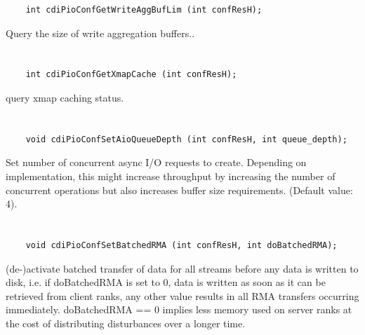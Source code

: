 \begin{verbatim}
    int cdiPioConfGetWriteAggBufLim (int confResH);
\end{verbatim}

Query the size of write
aggregation buffers..


\section*{\tt {}}

\begin{verbatim}
    int cdiPioConfGetXmapCache (int confResH);
\end{verbatim}

query xmap caching status.


\section*{\tt {}}

\begin{verbatim}
    void cdiPioConfSetAioQueueDepth (int confResH, int queue_depth);
\end{verbatim}

Set number of concurrent async I/O
requests to create. Depending on implementation, this might
increase throughput by increasing the number of concurrent
operations but also increases buffer size requirements.
(Default value: 4).


\section*{\tt {}}

\begin{verbatim}
    void cdiPioConfSetBatchedRMA (int confResH, int doBatchedRMA);
\end{verbatim}

(de-)activate batched transfer of data
for all streams before any data is written to disk, i.e. if
doBatchedRMA is set to 0, data is written as soon as it can be
retrieved from client ranks, any other value results in all RMA
transfers occurring immediately. doBatchedRMA == 0 implies less
memory used on server ranks at the cost of distributing
disturbances over a longer time.


\section*{\tt {}}

